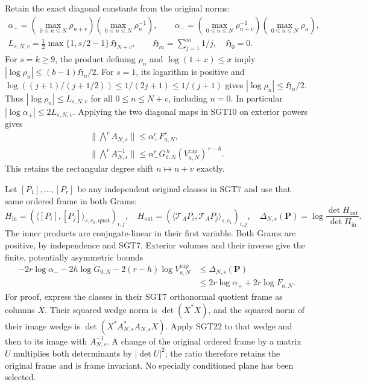 \documentclass[10pt]{article}
\begin{document}
Retain the exact diagonal constants from the original norms:
\[
\begin{gathered}
 \alpha_+=
  \left(\max_{0\le n\le N}\rho_{n+v}\right)
  \left(\max_{0\le n\le N}\rho_n^{-1}\right),\qquad
 \alpha_-=
  \left(\max_{0\le n\le N}\rho_{n+v}^{-1}\right)
  \left(\max_{0\le n\le N}\rho_n\right),\\
 L_{s,N,v}=\tfrac12\max\{1,s/2-1\}\,\mathfrak H_{N+v},
 \qquad \mathfrak H_m=\sum_{j=1}^m1/j,\quad\mathfrak H_0=0.
\end{gathered}\tag{SGT21}
\]
For $s=k\ge9$, the product defining $\rho_n$ and
$\log(1+x)\le x$ imply
$|\log\rho_n|\le(b-1)\mathfrak H_n/2$.
For $s=1$, its logarithm is positive and
$\log((j+1)/(j+1/2))\le1/(2j+1)\le1/(j+1)$ gives
$|\log\rho_n|\le\mathfrak H_n/2$.
Thus $|\log\rho_n|\le L_{s,N,v}$ for all $0\le n\le N+v$,
including $n=0$. In particular
$|\log\alpha_\pm|\le2L_{s,N,v}$.
Applying the two diagonal maps in SGT10 on exterior powers gives
\[
\begin{gathered}
 \|\bigwedge^r A_{N,s}\|
       \le\alpha_+^r F_{a,N}^r,\\
 \|\bigwedge^r A_{N,s}^{-1}\|
       \le\alpha_-^rG_{0,N}^{\,h}
                    (V_{a,N}^{\mathrm{cap}})^{\,r-h}.
\end{gathered}\tag{SGT22}
\]
This retains the rectangular degree shift $n\mapsto n+v$ exactly.

Let $[P_1],\ldots,[P_r]$ be any independent original classes in
SGT7 and use that same ordered frame in both Grams:
\[
 H_{\mathrm{in}}=
    (\langle[P_i],[P_j]\rangle_{s,c_0,\mathrm{quot}})_{i,j},
 \quad
 H_{\mathrm{out}}=
    (\langle\mathcal T_AP_i,\mathcal T_AP_j\rangle_{s,c_1})_{i,j},
 \quad
 \Delta_{N,s}(\mathbf P)=
          \log\frac{\det H_{\mathrm{out}}}{\det H_{\mathrm{in}}}.
 \tag{SGT23}
\]
The inner products are conjugate-linear in their first variable.
Both Grams are positive, by independence and SGT7. Exterior
volumes and their inverse give the finite, potentially asymmetric bounds
\[
\begin{split}
 -2r\log\alpha_- -2h\log G_{0,N}
            -2(r-h)\log V_{a,N}^{\mathrm{cap}}
 &\le\Delta_{N,s}(\mathbf P)\\
 &\le2r\log\alpha_+ +2r\log F_{a,N}.
\end{split}\tag{SGT24}
\]
For proof, express the classes in their SGT7 orthonormal quotient
frame as columns $X$. Their squared wedge norm is $\det(X^*X)$,
and the squared norm of their image wedge is
$\det(X^*A_{N,s}^*A_{N,s}X)$. Apply SGT22 to that wedge and then
to its image with $A_{N,s}^{-1}$. A change of the original ordered
frame by a matrix $U$ multiplies both determinants by $|\det U|^2$;
the ratio therefore retains the original frame and is frame invariant.
No specially conditioned plane has been selected.
\end{document}
